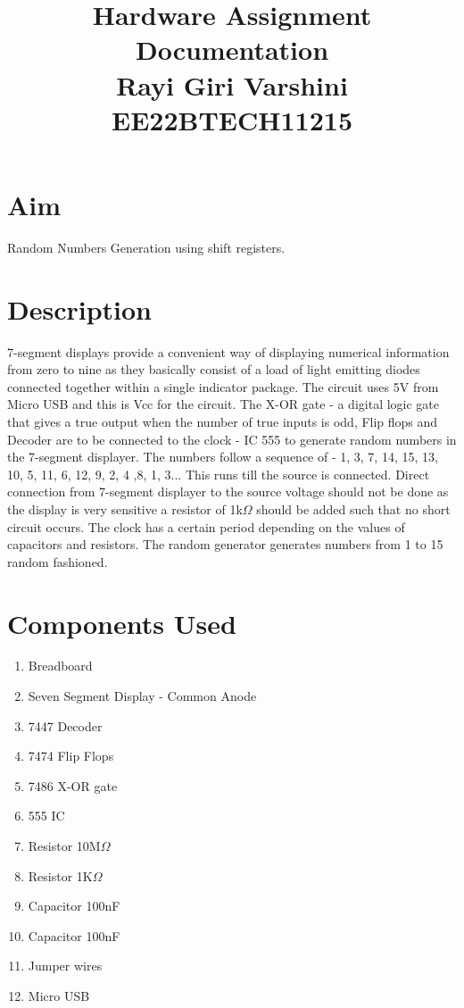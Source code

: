 \documentclass{article}
\begin{document}
\title{Hardware Assignment Documentation\\ \large{Rayi Giri Varshini\\EE22BTECH11215}}
\author{}
\date{}
\maketitle
\maketitle

\section*{Aim}
	Random Numbers Generation using shift registers.
\section*{Description}

	7-segment displays provide a convenient way of displaying numerical information from zero to nine as they basically consist of a load of light emitting diodes connected together within a single indicator package. The circuit uses 5V from Micro USB and this is Vcc for the circuit. The X-OR gate - a digital logic gate that gives a true output when the number of true inputs is odd, Flip flops and Decoder are to be connected to the clock - IC 555 to generate random numbers in the 7-segment displayer. The numbers follow a sequence of - 1, 3, 7, 14, 15, 13, 10, 5, 11, 6, 12, 9, 2, 4 ,8, 1, 3... This runs till the source is connected. Direct connection from 7-segment displayer to the source voltage should not be done as the display is very sensitive a resistor of 1k$\Omega$ should be added such that no short circuit occurs. The clock has a certain period depending on the values of capacitors and resistors. The random generator generates numbers from 1 to 15 random fashioned.  
    
\section*{Components Used}
\begin{enumerate}
    \item Breadboard
    \item Seven Segment Display - Common Anode
    \item 7447 Decoder
    \item 7474 Flip Flops
    \item 7486 X-OR gate
    \item 555 IC
    \item Resistor 10M$\Omega$
    \item Resistor 1K$\Omega$
    \item Capacitor 100nF
    \item Capacitor 100nF
    \item Jumper wires
    \item Micro USB
\end{enumerate}
\end{document}
